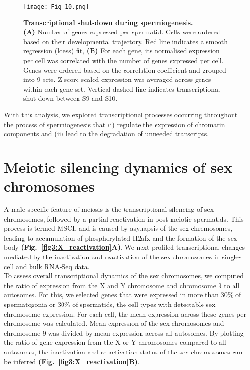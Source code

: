 \begin{figure}[!h]
\centering
\texttt{[image: Fig\_10.png]}
\caption[Transcriptional shut-down during spermiogenesis]{\textbf{Transcriptional shut-down during spermiogenesis.} \\
\textbf{(A)} Number of genes expressed per spermatid. Cells were ordered based on their developmental trajectory. Red line indicates a smooth regression (loess) fit, 
\textbf{(B)} For each gene, its normalised expression per cell was correlated with the number of genes expressed per cell. 
Genes were ordered based on the correlation coefficient and grouped into 9 sets. 
Z score scaled expression was averaged across genes within each gene set. Vertical dashed line indicates transcriptional shut-down between S9 and S10.}
\label{fig3:transcriptional_shutdown}
\end{figure}

With this analysis, we explored transcriptional processes occurring throughout the process of spermiogenesis that (i) regulate the expression of chromatin components and (ii) lead to the degradation of unneeded transcripts.

\newpage

\section{Meiotic silencing dynamics of sex chromosomes}

A male-specific feature of meiosis is the transcriptional silencing of sex chromosomes, followed by a partial reactivation in post-meiotic spermatids. 
This process is termed \gls{MSCI}, and is caused by asynapsis of the sex chromosomes, leading to accumulation of phosphorylated \gls{H2afx} and the formation of the sex body \citep{Hamer2003} \textbf{(Fig.~\ref{fig3:X_reactivation}A)}. 
We next profiled transcriptional changes mediated by the inactivation and reactivation of the sex chromosomes in single-cell and bulk RNA-Seq data. \\

To assess overall transcriptional dynamics of the sex chromosomes, we computed the ratio of expression from the X and Y chromosome and chromosome 9 to all autosomes. 
For this, we selected genes that were expressed in more than 30\% of spermatogonia or 30\% of spermatids, the cell types with detectable sex chromosome expression. 
For each cell, the mean expression across these genes per chromosome was calculated. Mean expression of the sex chromosomes and chromosome 9 was divided by mean expression across all autosomes. 
By plotting the ratio of gene expression from the X or Y chromosomes compared to all autosomes, the inactivation and re-activation status of the sex chromosomes can be inferred \textbf{(Fig.~\ref{fig3:X_reactivation}B)}. \\

